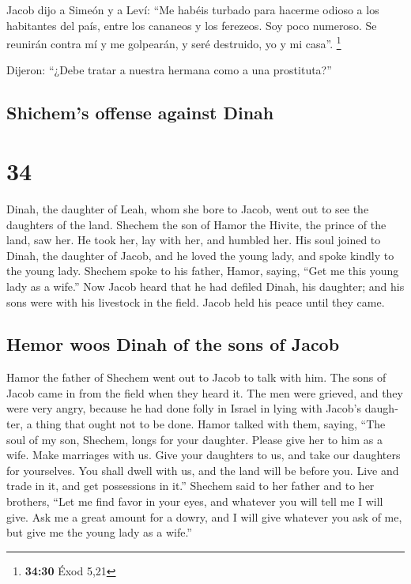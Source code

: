 \begin{paracol}{2}
 Jacob dijo a Simeón y a Leví: ``Me habéis turbado para
hacerme odioso a los habitantes del país, entre los cananeos y los
ferezeos. Soy poco numeroso. Se reunirán contra mí y me golpearán, y
seré destruido, yo y mi casa''. \footnote{\textbf{34:30} Éxod 5,21}

 Dijeron: ``¿Debe tratar a nuestra hermana como a una
prostituta?''

\switchcolumn
\begin{otherlanguage}{english}

\hypertarget{shichems-offense-against-dinah}{%
\subsection{Shichem's offense against
Dinah}\label{shichems-offense-against-dinah}}

\hypertarget{section-67}{%
\section{34}\label{section-67}}

 Dinah, the daughter of Leah, whom she bore to Jacob, went
out to see the daughters of the land.  Shechem the son of
Hamor the Hivite, the prince of the land, saw her. He took her, lay with
her, and humbled her.  His soul joined to Dinah, the
daughter of Jacob, and he loved the young lady, and spoke kindly to the
young lady.  Shechem spoke to his father, Hamor, saying,
``Get me this young lady as a wife.''  Now Jacob heard
that he had defiled Dinah, his daughter; and his sons were with his
livestock in the field. Jacob held his peace until they came.

\hypertarget{hemor-woos-dinah-of-the-sons-of-jacob}{%
\subsection{Hemor woos Dinah of the sons of
Jacob}\label{hemor-woos-dinah-of-the-sons-of-jacob}}

 Hamor the father of Shechem went out to Jacob to talk
with him.  The sons of Jacob came in from the field when
they heard it. The men were grieved, and they were very angry, because
he had done folly in Israel in lying with Jacob's daughter, a thing that
ought not to be done.  Hamor talked with them, saying,
``The soul of my son, Shechem, longs for your daughter. Please give her
to him as a wife.  Make marriages with us. Give your
daughters to us, and take our daughters for yourselves. 
You shall dwell with us, and the land will be before you. Live and trade
in it, and get possessions in it.''  Shechem said to her
father and to her brothers, ``Let me find favor in your eyes, and
whatever you will tell me I will give.  Ask me a great
amount for a dowry, and I will give whatever you ask of me, but give me
the young lady as a wife.''


\end{otherlanguage}
\end{paracol}
